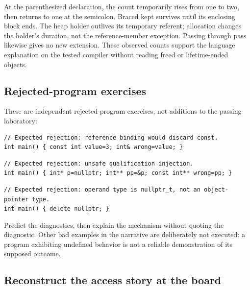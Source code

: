 At the parenthesized declaration, the count temporarily rises from one to two, then returns to one at the semicolon. Braced kept survives until its enclosing block ends. The heap holder outlives its temporary referent; allocation changes the holder's duration, not the reference-member exception. Passing through pass likewise gives no new extension. These observed counts support the language explanation on the tested compiler without reading freed or lifetime-ended objects.

\subsection{Rejected-program exercises}\label{01-foundations-i-ch004-rejected-program-exercises}

These are independent rejected-program exercises, not additions to the passing laboratory:

\begin{verbatim}
// Expected rejection: reference binding would discard const.
int main() { const int value=3; int& wrong=value; }
\end{verbatim}

\begin{verbatim}
// Expected rejection: unsafe qualification injection.
int main() { int* p=nullptr; int** pp=&p; const int** wrong=pp; }
\end{verbatim}

\begin{verbatim}
// Expected rejection: operand type is nullptr_t, not an object-pointer type.
int main() { delete nullptr; }
\end{verbatim}

Predict the diagnostics, then explain the mechanism without quoting the diagnostic. Other bad examples in the narrative are deliberately not executed: a program exhibiting undefined behavior is not a reliable demonstration of its supposed outcome.

\subsection{Reconstruct the access story at the board}\label{01-foundations-i-ch004-reconstruct-the-access-story-at-the-board}

